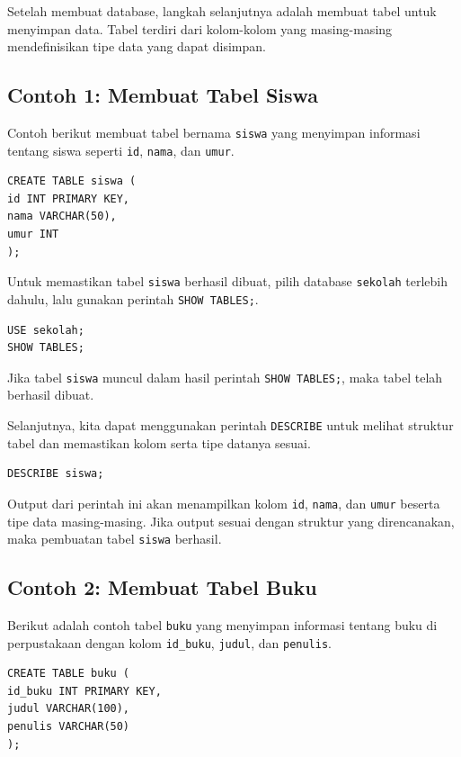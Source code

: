 Setelah membuat database, langkah selanjutnya adalah membuat tabel untuk menyimpan data. Tabel terdiri dari kolom-kolom yang masing-masing mendefinisikan tipe data yang dapat disimpan.

\subsection*{Contoh 1: Membuat Tabel Siswa}
Contoh berikut membuat tabel bernama \texttt{siswa} yang menyimpan informasi tentang siswa seperti \texttt{id}, \texttt{nama}, dan \texttt{umur}.

\begin{lstlisting}[style=sql]
CREATE TABLE siswa (
id INT PRIMARY KEY,
nama VARCHAR(50),
umur INT
);
\end{lstlisting}

Untuk memastikan tabel \texttt{siswa} berhasil dibuat, pilih database \texttt{sekolah} terlebih dahulu, lalu gunakan perintah \texttt{SHOW TABLES;}.

\begin{lstlisting}[style=sql]
USE sekolah;
SHOW TABLES;
\end{lstlisting}

Jika tabel \texttt{siswa} muncul dalam hasil perintah \texttt{SHOW TABLES;}, maka tabel telah berhasil dibuat.

Selanjutnya, kita dapat menggunakan perintah \texttt{DESCRIBE} untuk melihat struktur tabel dan memastikan kolom serta tipe datanya sesuai.

\begin{lstlisting}[style=sql]
DESCRIBE siswa;
\end{lstlisting}

Output dari perintah ini akan menampilkan kolom \texttt{id}, \texttt{nama}, dan \texttt{umur} beserta tipe data masing-masing. Jika output sesuai dengan struktur yang direncanakan, maka pembuatan tabel \texttt{siswa} berhasil.

\subsection*{Contoh 2: Membuat Tabel Buku}
Berikut adalah contoh tabel \texttt{buku} yang menyimpan informasi tentang buku di perpustakaan dengan kolom \texttt{id\_buku}, \texttt{judul}, dan \texttt{penulis}.

\begin{lstlisting}[style=sql]
CREATE TABLE buku (
id_buku INT PRIMARY KEY,
judul VARCHAR(100),
penulis VARCHAR(50)
);
\end{lstlisting}

